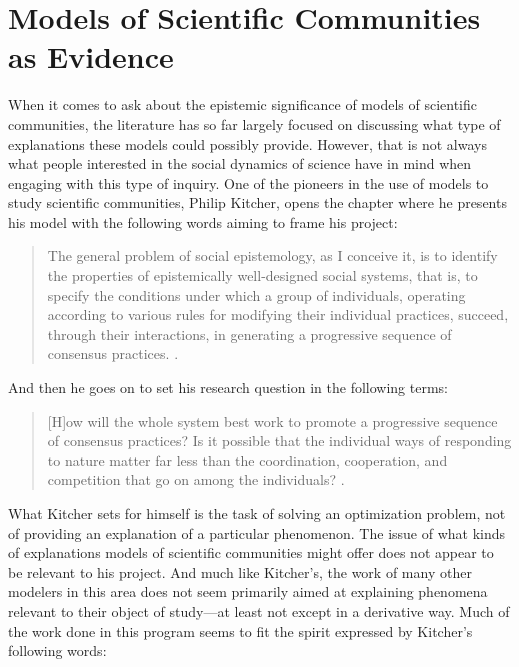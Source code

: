 \documentclass{article}
\begin{document}
\section{Models of Scientific Communities as Evidence}

When it comes to ask about the epistemic significance of models of scientific communities, the literature has so far largely focused on discussing what type of explanations these models could possibly provide. However, that is not always what people interested in the social dynamics of science have in mind when engaging with this type of inquiry. One of the pioneers in the use of models to study scientific communities, Philip Kitcher, opens the chapter where he presents his model with the following words aiming to frame his project:

\begin{quote}

    The general problem of social epistemology, as I conceive it, is to identify the properties of epistemically well-designed social systems, that is, to specify the conditions under which a group of individuals, operating according to various rules for modifying their individual practices, succeed, through their interactions, in generating a progressive sequence of consensus practices. \cite[p. 303]{kitcher.1995.AdvaScieScie}.
    
\end{quote}

And then he goes on to set his research question in the following terms:

\begin{quote}

    [H]ow will the whole system best work to promote a progressive sequence of consensus practices? Is it possible that the individual ways of responding to nature matter far less than the coordination, cooperation, and competition that go on among the individuals? \cite[p. 303]{kitcher.1995.AdvaScieScie}.
    
\end{quote}

What Kitcher sets for himself is the task of solving an optimization problem, not of providing an explanation of a particular phenomenon. The issue of what kinds of explanations models of scientific communities might offer does not appear to be relevant to his project. And much like Kitcher's, the work of many other modelers in this area does not seem primarily aimed at explaining phenomena relevant to their object of study—at least not except in a derivative way. Much of the work done in this program seems to fit the spirit expressed by Kitcher's following words:
\end{document}
